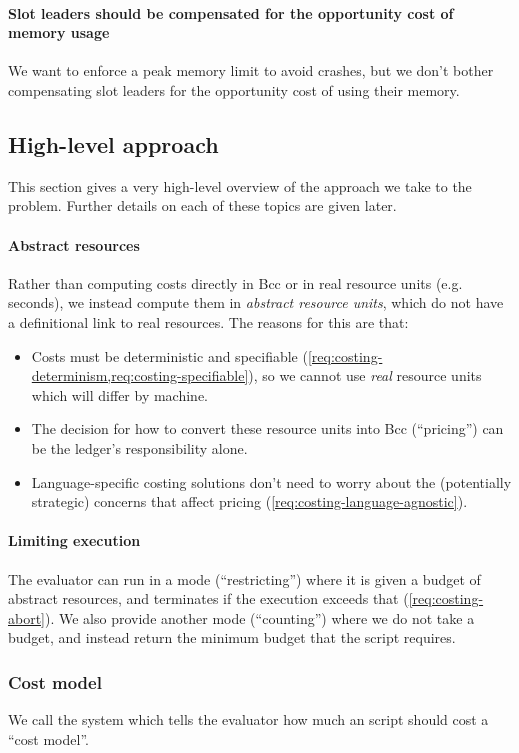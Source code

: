 \paragraph{Slot leaders should be compensated for the opportunity cost of memory usage}
We want to enforce a peak memory limit to avoid crashes, but we don't bother compensating slot leaders for the opportunity cost of using their memory.

\subsection{High-level approach}
This section gives a very high-level overview of the approach we take to the problem.
Further details on each of these topics are given later.

\paragraph{Abstract resources}
Rather than computing costs directly in Bcc or in real resource units (e.g. seconds), we instead compute them in \emph{abstract resource units}, which do not have a definitional link to real resources.
The reasons for this are that:
\begin{itemize}
\item Costs must be deterministic and specifiable (\cref{req:costing-determinism,req:costing-specifiable}), so we cannot use \emph{real} resource units which will differ by machine.
\item The decision for how to convert these resource units into Bcc (``pricing'') can be the ledger's responsibility alone.
\item Language-specific costing solutions don't need to worry about the (potentially strategic) concerns that affect pricing (\cref{req:costing-language-agnostic}).
\end{itemize}

\paragraph{Limiting execution}
The evaluator can run in a mode (``restricting'') where it is given a budget of abstract resources, and terminates if the execution exceeds that (\cref{req:costing-abort}).
We also provide another mode (``counting'') where we do not take a budget, and instead return the minimum budget that the script requires.

\subsubsection{Cost model}
We call the system which tells the evaluator how much an script should cost a ``cost model''.

